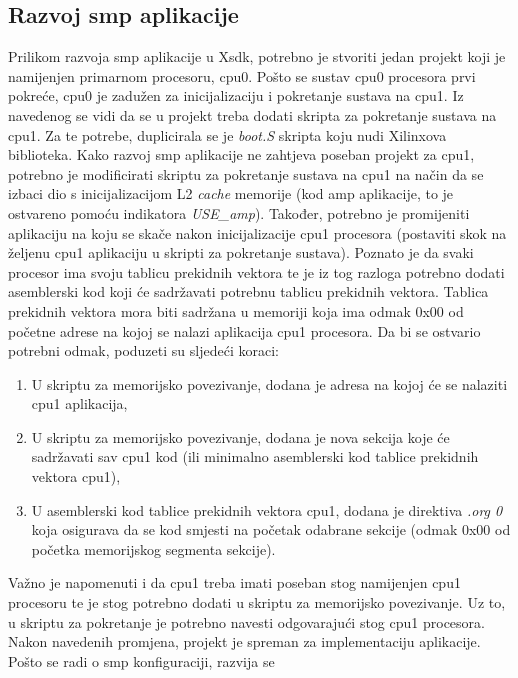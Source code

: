 \documentclass[times, utf8, diplomski, numeric]{fer}
\begin{document}
\subsection{Razvoj \gls{smp} aplikacije}
Prilikom razvoja \gls{smp} aplikacije u X\gls{sdk}, potrebno je stvoriti jedan projekt koji je namijenjen primarnom procesoru, \gls{cpu}0.
Pošto se sustav \gls{cpu}0 procesora prvi pokreće, \gls{cpu}0 je zadužen za inicijalizaciju i pokretanje sustava na \gls{cpu}1. Iz navedenog
se vidi da se u projekt treba dodati skripta za pokretanje sustava na \gls{cpu}1. Za te potrebe, duplicirala se je \textit{boot.S} skripta
koju nudi Xilinxova biblioteka. Kako razvoj \gls{smp} aplikacije ne zahtjeva poseban projekt za \gls{cpu}1, potrebno je modificirati
skriptu za pokretanje sustava na \gls{cpu}1 na način da se izbaci dio s inicijalizacijom L2 \textit{cache} memorije (kod \gls{amp}
aplikacije, to je ostvareno pomoću indikatora \textit{USE\_\gls{amp}}). Također, potrebno je promijeniti aplikaciju na koju se skače
nakon inicijalizacije \gls{cpu}1 procesora (postaviti skok na željenu \gls{cpu}1 aplikaciju u skripti za pokretanje sustava).
Poznato je da svaki procesor ima svoju tablicu
prekidnih vektora te je iz tog razloga potrebno dodati asemblerski kod koji će sadržavati potrebnu tablicu prekidnih vektora.
Tablica prekidnih vektora mora biti sadržana u memoriji koja ima odmak 0x00 od početne adrese na kojoj se nalazi
aplikacija \gls{cpu}1 procesora. Da bi se ostvario potrebni odmak, poduzeti su sljedeći koraci:
\begin{enumerate}
  \item{U skriptu za memorijsko povezivanje, dodana je adresa na kojoj će se nalaziti \gls{cpu}1 aplikacija,}
  \item{U skriptu za memorijsko povezivanje, dodana je nova sekcija koje će sadržavati sav \gls{cpu}1 kod (ili minimalno asemblerski
  kod tablice prekidnih vektora \gls{cpu}1),}
  \item{U asemblerski kod tablice prekidnih vektora \gls{cpu}1, dodana je direktiva \textit{.org 0} koja osigurava da se kod smjesti
  na početak odabrane sekcije (odmak 0x00 od početka memorijskog segmenta sekcije).}
\end{enumerate}
Važno je napomenuti i da \gls{cpu}1 treba imati poseban stog namijenjen \gls{cpu}1 procesoru te je stog potrebno dodati u skriptu za
memorijsko povezivanje. Uz to, u skriptu za pokretanje je potrebno navesti odgovarajući stog \gls{cpu}1 procesora.
Nakon navedenih promjena, projekt je spreman za implementaciju aplikacije. Pošto se radi o \gls{smp} konfiguraciji, razvija se
\end{document}
